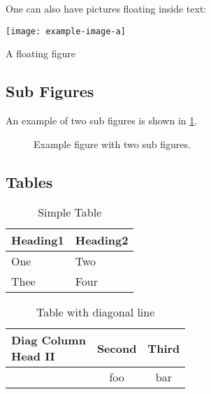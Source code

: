 \documentclass[runningheads,a4paper,english]{llncs}[2022/01/12]
\begin{document}
One can also have pictures floating inside text:
\clearpage

\begin{ltgexample}
\begin{floatingfigure}{.33\linewidth}
\texttt{[image: example-image-a]}
\caption{A floating figure}
\end{floatingfigure}
\blindtext[2]
\end{ltgexample}


\subsection{Sub Figures}

An example of two sub figures is shown in \cref{fig:two_sub_figures}.

\begin{ltgexample}
\begin{figure}[!b]
    \centering
  \hfil
  \caption{Example figure with two sub figures.}
  \label{fig:two_sub_figures}
\end{figure}
\end{ltgexample}

\subsection{Tables}

\begin{ltgexample}
\begin{table}
  \caption{Simple Table}
  \label{tab:simple}
  \centering
  \begin{tabular}{ll}
    \toprule
    Heading1 & Heading2 \\
    \midrule
    One      & Two      \\
    Thee     & Four     \\
    \bottomrule
  \end{tabular}
\end{table}
\end{ltgexample}

\begin{ltgexample}
\begin{table}
\caption{Table with diagonal line}
\label{tab:diag}
\begin{center}
\begin{tabular}{|l|c|c|}
\hline
\diagbox[width=10em]{Diag\\Column Head I}{Diag Column\\Head II} & Second & Third \\
\hline
& foo & bar \\
\hline
\end{tabular}
\end{center}
\end{table}
\end{ltgexample}
\end{document}
